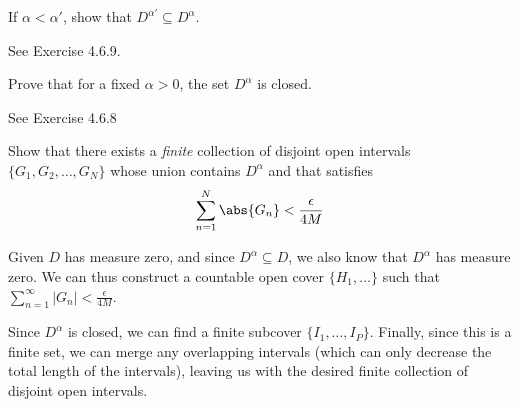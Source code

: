 \begin{exercise}
If \(\alpha < \alpha'\), show that \(D^{\alpha'} \subseteq D^\alpha\).
\end{exercise}

\begin{solution}
See Exercise 4.6.9.
\end{solution}

\begin{exercise}
\end{exercise}
\begin{solution}
\end{solution}

\begin{exercise}
Prove that for a fixed \(\alpha > 0\), the set \(D^\alpha\) is closed.
\end{exercise}

\begin{solution}
    See Exercise 4.6.8
\end{solution}

\begin{exercise}
Show that there exists a \emph{finite} collection of disjoint open intervals \(\{G_1, G_2, \dots, G_N\}\) whose union contains \(D^\alpha\) and that satisfies
\[\sum^N_{n=1} \abs{G_n} < \frac{\epsilon}{4M}\]
\end{exercise}

\begin{solution}
Given \(D\) has measure zero, and since \(D^\alpha \subseteq D\), we also know that \(D^\alpha\) has measure zero. We can thus construct a countable open cover \(\{H_1, \dots\}\) such that \(\sum^\infty_{n=1} |G_n| < \frac{\epsilon}{4M}\).

Since \(D^\alpha\) is closed, we can find a finite subcover \(\{I_1, \dots, I_P\}\). Finally, since this is a finite set, we can merge any overlapping intervals (which can only decrease the total length of the intervals), leaving us with the desired finite collection of disjoint open intervals.
\end{solution}

